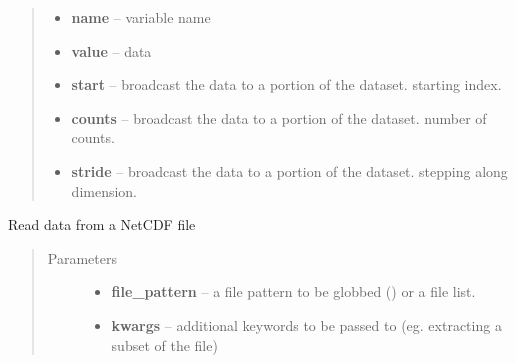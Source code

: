 \documentclass[letterpaper,10pt,english]{sphinxmanual}
\begin{document}
\begin{fulllineitems}
\begin{fulllineitems}
\begin{quote}
\begin{description}
\begin{itemize}
\item {} 
\textbf{name} -- variable name

\item {} 
\textbf{value} -- data

\item {} 
\textbf{start} -- broadcast the data to a portion of the dataset. starting index.

\item {} 
\textbf{counts} -- broadcast the data to a portion of the dataset. number of counts.

\item {} 
\textbf{stride} -- broadcast the data to a portion of the dataset. stepping along dimension.

\end{itemize}

\end{description}\end{quote}

\end{fulllineitems}


\begin{fulllineitems}
\label{altimetry.tools.nctools:altimetry.tools.nctools.nc.read}
Read data from a NetCDF file
\begin{quote}\begin{description}
\item[{Parameters}] \leavevmode\begin{itemize}
\item {} 
\textbf{file\_pattern} -- a file pattern to be globbed (\href{http://docs.python.org/library/glob.html\#glob.glob}{}) or a file list.

\item {} 
\textbf{kwargs} -- additional keywords to be passed to {\hyperref[altimetry.tools.nctools:altimetry.tools.nctools.nc.load]{}} (eg. extracting a subset of the file)

\end{itemize}

\end{description}\end{quote}

\end{fulllineitems}



\end{fulllineitems}
\end{document}
